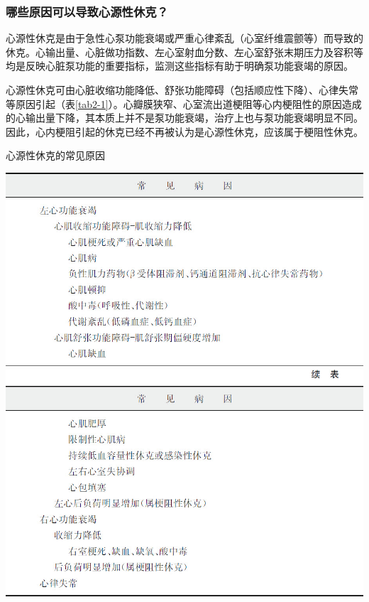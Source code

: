 \subsubsection{哪些原因可以导致心源性休克？}

心源性休克是由于急性心泵功能衰竭或严重心律紊乱（心室纤维震颤等）而导致的休克。心输出量、心脏做功指数、左心室射血分数、左心室舒张末期压力及容积等均是反映心脏泵功能的重要指标，监测这些指标有助于明确泵功能衰竭的原因。

心源性休克可由心脏收缩功能降低、舒张功能障碍（包括顺应性下降）、心律失常等原因引起（表\ref{tab2-1}）。心瓣膜狭窄、心室流出道梗阻等心内梗阻性的原因造成的心输出量下降，其本质上并不是泵功能衰竭，治疗上也与泵功能衰竭明显不同。因此，心内梗阻引起的休克已经不再被认为是心源性休克，应该属于梗阻性休克。

\begin{table}[htbp]
\centering
\caption{心源性休克的常见原因}
\label{tab2-1}
\includegraphics[width=\textwidth,height=\textheight,keepaspectratio]{./images/Image00012.jpg}
\includegraphics[width=\textwidth,height=\textheight,keepaspectratio]{./images/Image00013.jpg}
\end{table}



